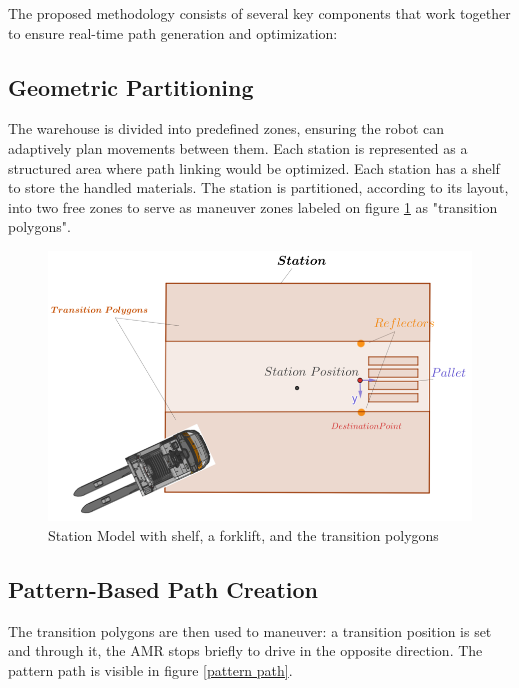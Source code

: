 \documentclass{amam}                %
\begin{document}
The proposed methodology consists of several key components that work together to ensure real-time path generation and optimization:
\subsection{Geometric Partitioning}
The warehouse is divided into predefined zones, ensuring the robot can adaptively plan movements between them. Each station is represented as a structured area where path linking would be optimized.
Each station has a shelf to store the handled materials. The station is partitioned, according to its layout,
into two free zones to serve as maneuver zones labeled on figure \ref{geometric_partitioning} as "transition polygons".

\begin{figure}[t]
  \centering \includegraphics[width=1.0\linewidth]{geometric_partitioning.png}
  \caption{Station Model with shelf, a forklift, and the transition polygons \cite{ref2}}
  \label{geometric_partitioning}
\end{figure}

\subsection{Pattern-Based Path Creation}
The transition polygons are then used to maneuver: a transition position is set and through it, the AMR stops briefly to drive in the opposite direction. The pattern path is visible in figure \ref{pattern path}.
\end{document}
